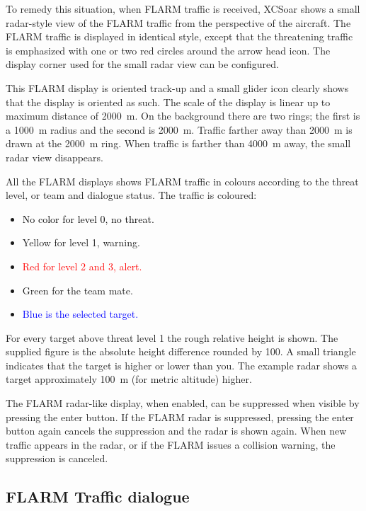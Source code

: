 To remedy this situation, when FLARM traffic is received, XCSoar shows a 
small radar-style view of the FLARM
traffic from the perspective of the aircraft.  The FLARM traffic is
displayed in identical style, except that the threatening traffic is emphasized 
with one or two red circles around the arrow head icon.  The display corner used 
for the small radar view can be configured.

This FLARM display is oriented track-up and a small glider icon
clearly shows that the display is oriented as such.  The scale of the
display is linear up to maximum distance of 2000~m.  On the
background there are two rings; the first is a 1000~m radius and the second
is 2000~m.  Traffic farther away than 2000~m is drawn at the 2000~m ring.
When traffic is farther than 4000~m away, the small radar view disappears.

All the FLARM displays shows FLARM traffic in colours according to
the threat level, or team and dialogue status.  The traffic is coloured:
\begin{itemize}
\item \textcolor{black} {No color for level 0, no threat.} 
\item \textcolor{warning} { Yellow for level 1, warning.}
\item \textcolor{red} {Red for level 2 and 3, alert.}
\item \textcolor{teammate} {Green for the team mate.}
\item \textcolor{blue} {Blue is the selected target.}
\end{itemize}

For every target above threat level 1 the rough relative height is shown. The
supplied figure is the absolute height difference rounded by 100.  A small
triangle indicates that the target is higher or lower than you.  The example
radar shows a target approximately 100~m (for metric altitude) higher.

The FLARM radar-like display, when enabled, can be suppressed when
visible by pressing the enter button.  If the
FLARM radar is suppressed, pressing the enter button again cancels the
suppression and the radar is shown again.  When new traffic appears in
the radar, or if the FLARM issues a collision warning, the suppression
is canceled.


\subsection*{FLARM Traffic dialogue}\label{sec:flarm-traffic}

